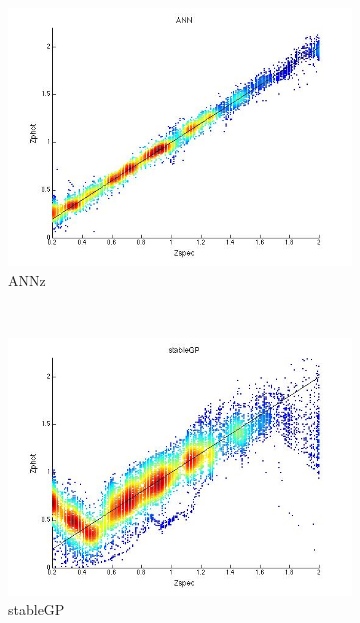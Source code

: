 \documentclass[useAMS,usenatbib,fleqn]{mn2e}
\begin{document}
\begin{figure}
        \centering
        \begin{subfigure}[b]{0.3\textwidth}
                \includegraphics[width=\textwidth]{figures/ANN}
                \caption{{\sc ANNz}}
                \label{annz-plot}
        \end{subfigure}
        ~
        \begin{subfigure}[b]{0.3\textwidth}
                \includegraphics[width=\textwidth]{figures/stableGP}
                \caption{{\sc stableGP}}
                \label{stableGP-plot}
        \end{subfigure}
        ~
        \begin{subfigure}[b]{0.3\textwidth}

\end{subfigure}
\end{figure}
\end{document}

